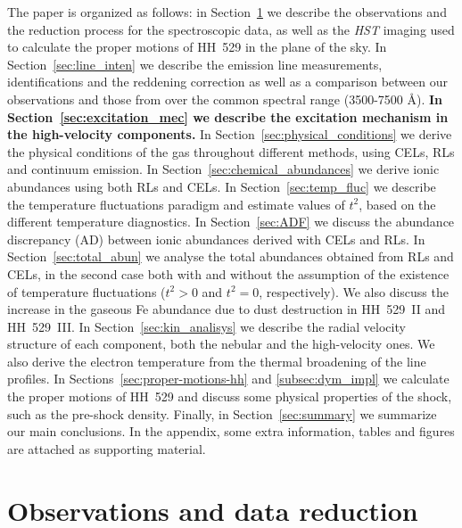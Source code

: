 \documentclass[fleqn,usenatbib]{mnras}
\begin{document}
The paper is organized as follows: in Section~\ref{sec:data} we describe the observations and the reduction process for the spectroscopic data, as well as the {\it HST} imaging used to calculate the proper motions of HH~529 in the plane of the sky. In Section~\ref{sec:line_inten} we describe the emission line measurements, identifications and the reddening correction as well as a comparison between our observations and those from \citet{Blagrave06} over the common spectral range (3500-7500 \AA). {\bf In Section~\ref{sec:excitation_mec} we describe the excitation mechanism in the high-velocity components.} In Section~\ref{sec:physical_conditions} we derive the physical conditions of the gas throughout different methods, using CELs, RLs and continuum emission. In Section~\ref{sec:chemical_abundances} we derive ionic abundances using both RLs and CELs. In Section~\ref{sec:temp_fluc} we describe the temperature fluctuations paradigm and estimate values of $t^2$, based on the different temperature diagnostics. In Section~\ref{sec:ADF} we discuss the abundance discrepancy (AD) between ionic abundances derived with CELs and RLs. In Section~\ref{sec:total_abun} we analyse the total abundances obtained from RLs and CELs, in the second case both with and without the assumption of the existence of temperature fluctuations ($t^2>0$ and $t^2=0$, respectively). We also discuss the increase in the gaseous Fe abundance due to dust destruction in HH~529~II and HH~529~III. In Section~\ref{sec:kin_analisys} we describe the radial velocity structure of each component, both the nebular and the high-velocity ones. We also derive the electron temperature from the thermal broadening of the line profiles. In Sections~\ref{sec:proper-motions-hh} and \ref{subsec:dym_impl} we calculate the proper motions of HH~529 and discuss some physical properties of the shock, such as the pre-shock density. Finally, in Section~\ref{sec:summary} we summarize our main conclusions. In the appendix, some extra information, tables and figures are attached as supporting material. 




\section{Observations and data reduction}
\label{sec:data}
\end{document}
